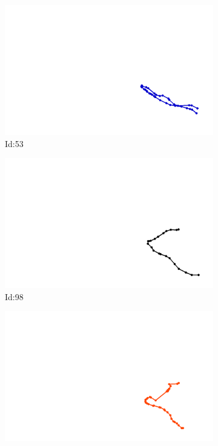 \documentclass[12pt,twoside]{report}
\begin{document}
\begin{figure}
\centering
\begin{subfigure}[b]{0.20\textwidth}
\centering
\includegraphics[width=\textwidth]{../../trajectories/53.png}
\caption{Id:53}
\end{subfigure}
\begin{subfigure}[b]{0.20\textwidth}
\centering
\includegraphics[width=\textwidth]{../../trajectories/98.png}
\caption{Id:98}
\end{subfigure}
\begin{subfigure}[b]{0.20\textwidth}
\centering
\includegraphics[width=\textwidth]{../../trajectories/223.png}

\end{subfigure}
\end{figure}
\end{document}

